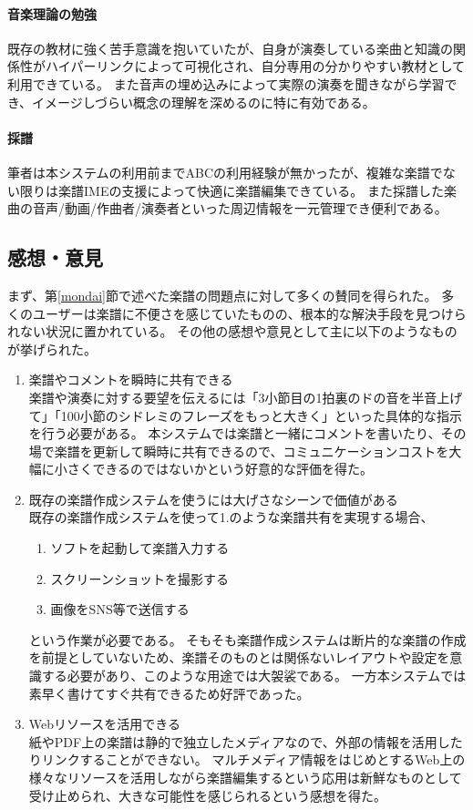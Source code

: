 \paragraph*{音楽理論の勉強}
既存の教材に強く苦手意識を抱いていたが、自身が演奏している楽曲と知識の関係性がハイパーリンクによって可視化され、自分専用の分かりやすい教材として利用できている。
また音声の埋め込みによって実際の演奏を聞きながら学習でき、イメージしづらい概念の理解を深めるのに特に有効である。
\paragraph*{採譜}
筆者は本システムの利用前までABCの利用経験が無かったが、複雑な楽譜でない限りは楽譜IMEの支援によって快適に楽譜編集できている。
また採譜した楽曲の音声/動画/作曲者/演奏者といった周辺情報を一元管理でき便利である。

\subsection{感想・意見}
まず、第\ref{mondai}節で述べた楽譜の問題点に対して多くの賛同を得られた。
多くのユーザーは楽譜に不便さを感じていたものの、根本的な解決手段を見つけられない状況に置かれている。
その他の感想や意見として主に以下のようなものが挙げられた。

\begin{enumerate}
    \item 楽譜やコメントを瞬時に共有できる\\
    楽譜や演奏に対する要望を伝えるには「3小節目の1拍裏のドの音を半音上げて」「100小節のシドレミのフレーズをもっと大きく」といった具体的な指示を行う必要がある。
    本システムでは楽譜と一緒にコメントを書いたり、その場で楽譜を更新して瞬時に共有できるので、コミュニケーションコストを大幅に小さくできるのではないかという好意的な評価を得た。
    \item 既存の楽譜作成システムを使うには大げさなシーンで価値がある\\
    既存の楽譜作成システムを使って1.のような楽譜共有を実現する場合、
    \begin{enumerate}
        \item ソフトを起動して楽譜入力する
        \item スクリーンショットを撮影する
        \item 画像をSNS等で送信する
    \end{enumerate}という作業が必要である。
    そもそも楽譜作成システムは断片的な楽譜の作成を前提としていないため、楽譜そのものとは関係ないレイアウトや設定を意識する必要があり、このような用途では大袈裟である。
    一方本システムでは素早く書けてすぐ共有できるため好評であった。
    \item Webリソースを活用できる\\
    紙やPDF上の楽譜は静的で独立したメディアなので、外部の情報を活用したりリンクすることができない。
    マルチメディア情報をはじめとするWeb上の様々なリソースを活用しながら楽譜編集するという応用は新鮮なものとして受け止められ、大きな可能性を感じられるという感想を得た。
\end{enumerate}

